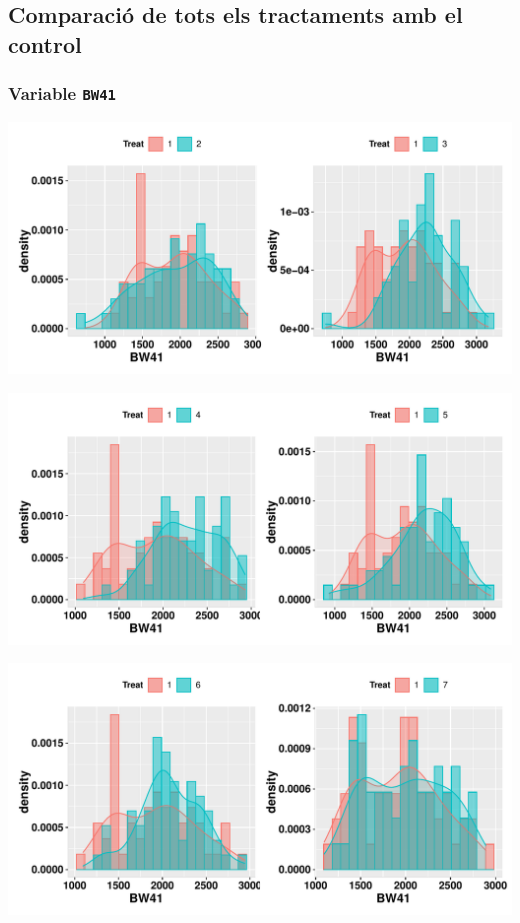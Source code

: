 \documentclass[11pt,a4paper]{article}\usepackage[]{graphicx}\usepackage[]{color}
\makeatletter
\def\maxwidth{ %
  \ifdim\Gin@nat@width>\linewidth
    \linewidth
  \else
    \Gin@nat@width
  \fi
}
\newenvironment{knitrout}{}{} %
\makeatother
\begin{document}
\subsection{Comparació de tots els tractaments amb el control}



\subsubsection{Variable \texttt{BW41}}
\begin{knitrout}
\color{fgcolor}
\includegraphics[width=\maxwidth]{figure/unnamed-chunk-10-1} 

\includegraphics[width=\maxwidth]{figure/unnamed-chunk-10-2} 

\includegraphics[width=\maxwidth]{figure/unnamed-chunk-10-3} 


\end{knitrout}
\end{document}
